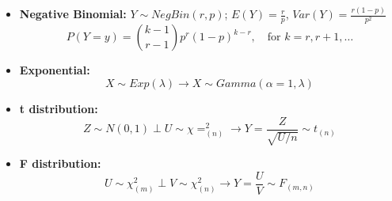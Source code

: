 \documentclass[12pt]{article}
\begin{document}
\begin{itemize}
    \item {\bf Negative Binomial:} $Y \sim NegBin(r, p)$; $E(Y) = \frac{r}{p}$, $Var(Y) = \frac{r(1-p)}{p^2}$\\
    $$P(Y=y) = {k-1 \choose r-1}p^r(1-p)^{k-r}, \quad \text{for } k =r, r+1, \dots$$
    \item {\bf Exponential:} 
    $$ X \sim Exp(\lambda) \rightarrow X \sim Gamma(\alpha=1, \lambda)$$
    \item {\bf t distribution:}
    $$Z \sim N(0,1) \perp U \sim \chi =^2_{(n)} \rightarrow Y = \frac{Z}{\sqrt{U/n}} \sim t_{(n)}$$
    \item {\bf F distribution:} 
    $$U \sim \chi^2_{(m)} \perp V \sim \chi^2_{(n)} \rightarrow Y = \frac{U}{V} \sim F_{(m,n)}$$
\end{itemize}
\end{document}
